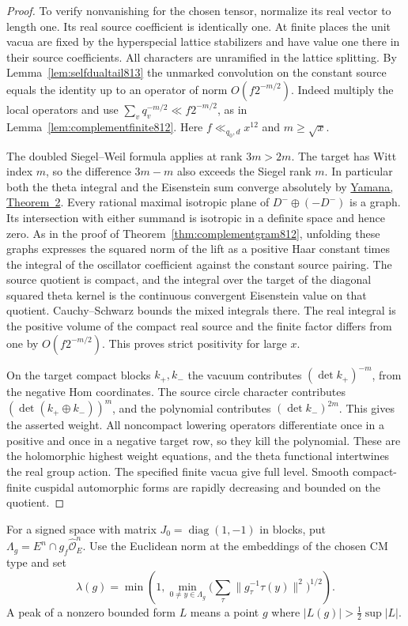 \documentclass[a4paper,11pt]{article}
\theoremstyle{definition}
\theoremstyle{remark}
\numberwithin{equation}{section}
\begin{document}
\begin{proof}
To verify nonvanishing for the chosen tensor, normalize its
real vector to length one. Its real source coefficient is
identically one. At finite places the unit vacua are fixed
by the hyperspecial lattice stabilizers and have value one
there in their source coefficients. All characters are
unramified in the lattice splitting. By
Lemma~\ref{lem:selfdualtail813} the unmarked convolution on
the constant source equals the identity up to an operator
of norm \(O(f2^{-m/2})\). Indeed multiply the local
operators and use
\(\sum_v q_v^{-m/2}\ll f2^{-m/2}\), as in
Lemma~\ref{lem:complementfinite812}. Here \(f\ll_{q_0,d}x^{12}\)
and \(m\ge\sqrt{x}\).

The doubled Siegel--Weil formula applies at rank \(3m>2m\).
The target has Witt index \(m\), so the difference \(3m-m\)
also exceeds the Siegel rank \(m\). In particular both
the theta integral and the Eisenstein sum converge
absolutely by \href{https://msp.org/pjm/2013/264-1/pjm-v264-n1-p11-s.pdf}
{Yamana, Theorem~2}. Every rational maximal isotropic plane
of \(D^-\oplus(-D^-)\) is a graph. Its intersection with
either summand is isotropic in a definite space and hence
zero. As in the proof of Theorem~\ref{thm:complementgram812},
unfolding these graphs expresses the squared norm of
the lift as a positive Haar constant times the integral
of the oscillator coefficient against the constant source
pairing. The source quotient is compact, and the integral over the
target of the diagonal squared theta kernel is the continuous
convergent Eisenstein value on that quotient. Cauchy--Schwarz
bounds the mixed integrals there. The real integral is the
positive volume of the compact real source and the finite
factor differs from one by \(O(f2^{-m/2})\). This proves
strict positivity for large \(x\).

On the target compact blocks \(k_+,k_-\) the vacuum contributes
\((\det k_+)^{-m}\), from the negative Hom coordinates. The
source circle character contributes \((\det(k_+\oplus
k_-))^m\), and the polynomial contributes \((\det k_-)^{2m}\).
This gives the asserted weight. All noncompact lowering
operators differentiate once in a positive and once in a
negative target row, so they kill the polynomial. These are
the holomorphic highest weight equations, and the theta
functional intertwines the real group action. The specified
finite vacua give full level. Smooth compact-finite
cuspidal automorphic forms are rapidly decreasing and
bounded on the quotient.
\end{proof}

For a signed space with matrix \(J_0=\operatorname{diag}(1,-1)\)
in blocks, put \(\Lambda_g=E^n\cap g_f\widehat{\mathcal O}_E^n\).
Use the Euclidean norm at the embeddings of the chosen CM
type and set
\[
 \lambda(g)=\min\left(1,\min_{0\ne y\in\Lambda_g}
      \Big(\sum_{\tau}\|g_\tau^{-1}\tau(y)\|^2\Big)^{1/2}\right).
\]
A peak of a nonzero bounded form \(L\) means a point \(g\)
where \(|L(g)|>\tfrac12\sup |L|\).
\end{document}
